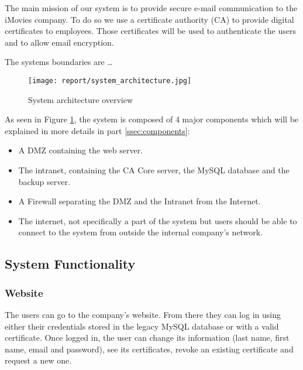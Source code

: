 \documentclass[english]{article}
\begin{document}

The main mission of our system is to provide secure e-mail communication to the iMovies company. To do so we use a certificate authority (CA) to provide digital certificates to employees. Those certificates will be used to authenticate the users and to allow email encryption.

The systems boundaries are \dots

\begin{figure}
  \texttt{[image: report/system\_architecture.jpg]}
  \caption{System architecture overview}
  \label{fig:system_architecture}
\end{figure}

\FloatBarrier

As seen in Figure \ref{fig:system_architecture}, the system is composed of 4 major components which will be explained in more details in part \ref{ssec:components}:
\begin{itemize}
    \item A DMZ containing the web server.
    \item The intranet, containing the CA Core server, the MySQL database and the backup server.
    \item A Firewall separating the DMZ and the Intranet from the Internet.
    \item The internet, not specifically a part of the system but users should be able to connect to the system from outside the internal company's network.
\end{itemize}

\subsection{System Functionality}\label{ssec:system_func}


\subsubsection{Website}
The users can go to the company's website. From there they can log in using either their credentials stored in the legacy MySQL database or with a valid certificate.
Once logged in, the user can change its information (last name, first name, email and password), see its certificates, revoke an existing certificate and request a new one.
\end{document}
